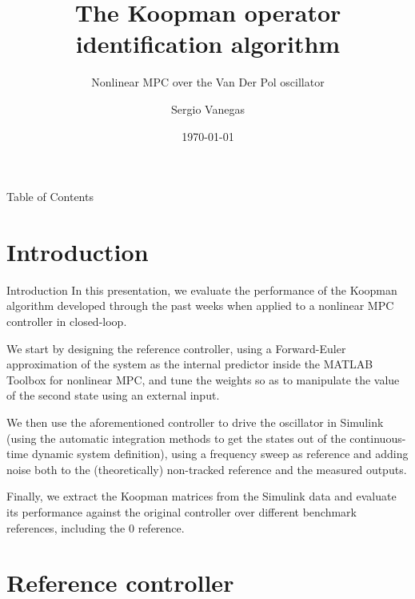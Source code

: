 \documentclass{beamer}
\title[Process]{The Koopman operator identification algorithm}
\subtitle{Nonlinear MPC over the Van Der Pol oscillator}
\institute[Polimi]{Politecnico di Milano}
\author{Sergio Vanegas}
\date{\today}
\begin{document}
\begin{frame}
    \maketitle
\end{frame}

\begin{frame}{Table of Contents}
    \tableofcontents
\end{frame}

\section{Introduction}

\begin{frame}{Introduction}
    In this presentation, we evaluate the performance of the Koopman algorithm developed through the past weeks when applied to a nonlinear MPC controller in closed-loop.

    We start by designing the reference controller, using a Forward-Euler approximation of the system as the internal predictor inside the MATLAB Toolbox for nonlinear MPC, and tune the weights so as to manipulate the value of the second state using an external input.

    We then use the aforementioned controller to drive the oscillator in Simulink (using the automatic integration methods to get the states out of the continuous-time dynamic system definition), using a frequency sweep as reference and adding noise both to the (theoretically) non-tracked reference and the measured outputs.

    Finally, we extract the Koopman matrices from the Simulink data and evaluate its performance against the original controller over different benchmark references, including the 0 reference.
\end{frame}


\section{Reference controller}
\end{document}
